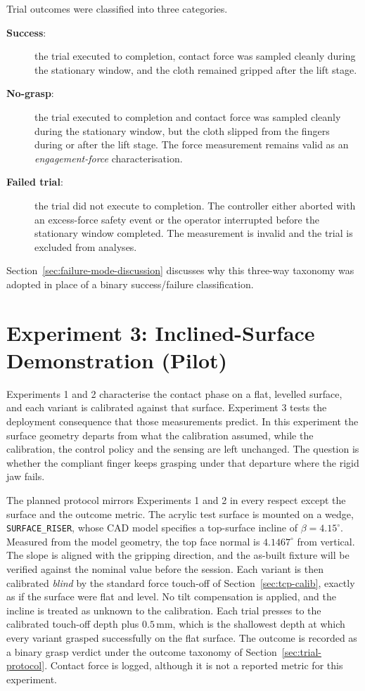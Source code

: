 Trial outcomes were classified into three categories.
\begin{description}
  \item[\textbf{Success}:] the trial executed to completion, contact
        force was sampled cleanly during the stationary window, and the
        cloth remained gripped after the lift stage.
  \item[\textbf{No-grasp}:] the trial executed to completion and
        contact force was sampled cleanly during the stationary window,
        but the cloth slipped from the fingers during or after the lift
        stage. The force measurement remains valid as an
        \emph{engagement-force} characterisation.
  \item[\textbf{Failed trial}:] the trial did not execute to completion.
        The controller either aborted with an excess-force safety event
        or the operator interrupted before the stationary window
        completed. The measurement is invalid and the trial is excluded
        from analyses.
\end{description}

Section~\ref{sec:failure-mode-discussion} discusses why this three-way
taxonomy was adopted in place of a binary success/failure
classification.

\section{Experiment 3: Inclined-Surface Demonstration (Pilot)}
\label{sec:experiment3}

Experiments 1 and 2 characterise the contact phase on a flat, levelled
surface, and each variant is calibrated against that surface.
Experiment 3 tests the deployment consequence that those measurements
predict. In this experiment the surface geometry departs from what the
calibration assumed, while the calibration, the control policy and the
sensing are left unchanged. The question is whether the compliant
finger keeps grasping under that departure where the rigid jaw fails.

The planned protocol mirrors Experiments 1 and 2 in every respect except
the surface and the outcome metric. The acrylic test surface is mounted
on a wedge, \texttt{SURFACE\_RISER}, whose CAD model specifies a
top-surface incline of $\beta = 4.15^{\circ}$. Measured from the model
geometry, the top face normal is $4.1467^{\circ}$ from vertical. The
slope is aligned with the gripping direction, and the as-built fixture
will be verified against the nominal value before the session. Each
variant is then calibrated \emph{blind} by the standard force touch-off
of Section~\ref{sec:tcp-calib}, exactly as if the surface were flat and
level. No tilt compensation is applied, and the incline is treated as
unknown to the calibration. Each trial presses to the calibrated
touch-off depth plus $0.5$\,mm, which is the shallowest depth at which
every variant grasped successfully on the flat surface. The outcome is
recorded as a binary grasp verdict under the outcome taxonomy of
Section~\ref{sec:trial-protocol}. Contact force is logged, although it
is not a reported metric for this experiment.

